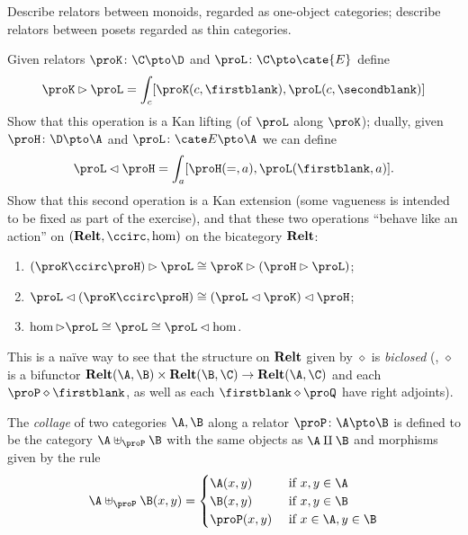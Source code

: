 \begin{exerciseset}
\begin{exercisepoints}
\item Describe relators between monoids, regarded as one-object categories; describe relators between posets regarded as thin categories.
\item Given relators $\proK\colon \C\pto \D$ and $\proL\colon \C\pto\cate{E}$ define
\begin{gather*}
\proK\rhd \proL = \int_c [\proK(c,\firstblank), \proL(c,\secondblank)] 
\end{gather*}
Show that this operation is a Kan lifting (of $\proL$ along $\proK$); dually, given $\proH \colon \D\pto \A$ and  $\proL\colon \cate E\pto \A$ we can define 
\[
\proL\lhd \proH = \int_a [\proH(=,a), \proL(\firstblank,a)].
\]
Show that this second operation is a Kan extension (some vagueness is intended to be fixed as part of the exercise), and that these two operations ``behave like an action'' on $(\Dist,\ccirc,\hom)$ on the bicategory $\textbf{Relt}$:
\begin{enumerate}[label=\textbf{\roman*})]
\item $(\proK\ccirc \proH)\rhd \proL\cong \proK\rhd(\proH\rhd \proL)$;
\item $\proL \lhd(\proK \ccirc \proH)\cong (\proL\lhd \proK)\lhd \proH$;
\item $\hom\rhd \proL\cong \proL\cong \proL\lhd \hom$.
\end{enumerate}
This is a na\"ive way to see that the structure on $\textbf{Relt}$ given by $\diamond$ is \emph{biclosed} (\ie, $\diamond$ is a bifunctor $\Dist(\A,\B)\times \Dist(\B,\C) \to \Dist(\A,\C)$ and each $\proP\diamond\firstblank$, as well as each $\firstblank\diamond \proQ$ have right adjoints).
\item The \emph{collage} of two categories $\A,\B$ along a relator $\proP\colon \A \pto \B$ is defined to be the category $\A \uplus_\proP \B$ with the same objects as $\A \amalg \B$ and morphisms given by the rule
\[
\A\uplus_\proP \B(x,y) =
\begin{cases}
\A(x,y) & \text{ if } x,y\in\A\\
\B(x,y) & \text{ if } x,y\in \B\\
\proP(x,y) & \text{ if } x\in \A, y\in\B

\end{cases}\]
\end{exercisepoints}
\end{exerciseset}
